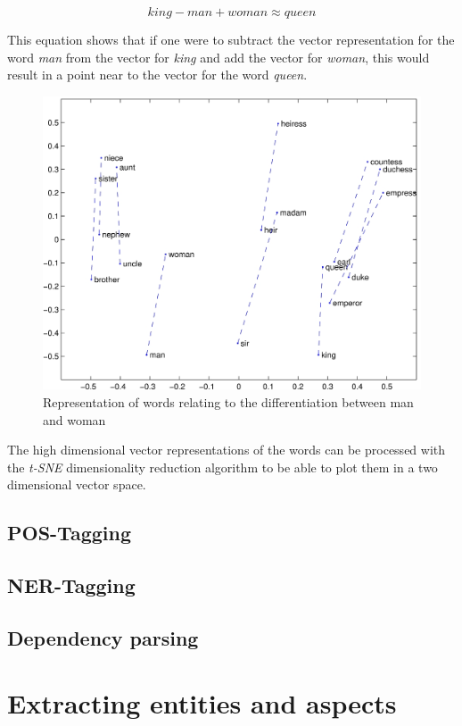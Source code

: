 \documentclass[10pt,a4paper]{article}
\begin{document}
		\begin{displaymath}
			king-man+woman \approx queen
		\end{displaymath}
		
		This equation shows that if one were to subtract the vector representation for the word \textit{man} from the vector for \textit{king} and add the vector for \textit{woman}, this would result in a point near to the vector for the word \textit{queen}.
		
		\begin{figure}[h]
			\centering
			\includegraphics[width=0.8\linewidth]{data/man_woman}
			\caption{Representation of words relating to the differentiation between man and woman}
		\end{figure}
		
		The high dimensional vector representations of the words can be processed with the \textit{t-SNE} dimensionality reduction algorithm to be able to plot them in a two dimensional vector space.
		
		\subsection{POS-Tagging}
		
		\subsection{NER-Tagging}
		
		\subsection{Dependency parsing}
	
	\section{Extracting entities and aspects}
	
\end{document}
